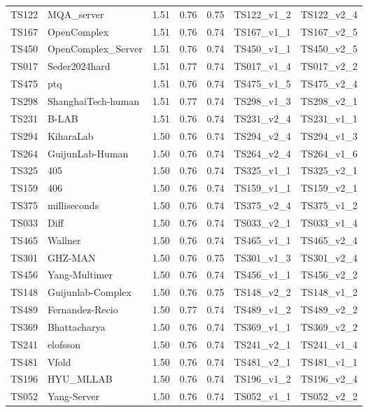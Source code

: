 \begin{longtable}{lllllll}
TS122 & MQA\_server & 1.51 & 0.76 & 0.75 & TS122\_v1\_2 & TS122\_v2\_4 \\ 
TS167 & OpenComplex & 1.51 & 0.76 & 0.74 & TS167\_v1\_1 & TS167\_v2\_5 \\ 
TS450 & OpenComplex\_Server & 1.51 & 0.76 & 0.74 & TS450\_v1\_1 & TS450\_v2\_5 \\ 
TS017 & Seder2024hard & 1.51 & 0.77 & 0.74 & TS017\_v1\_4 & TS017\_v2\_2 \\ 
TS475 & ptq & 1.51 & 0.76 & 0.74 & TS475\_v1\_5 & TS475\_v2\_4 \\ 
TS298 & ShanghaiTech-human & 1.51 & 0.77 & 0.74 & TS298\_v1\_3 & TS298\_v2\_1 \\ 
TS231 & B-LAB & 1.51 & 0.76 & 0.74 & TS231\_v2\_4 & TS231\_v1\_1 \\ 
TS294 & KiharaLab & 1.50 & 0.76 & 0.74 & TS294\_v2\_4 & TS294\_v1\_3 \\ 
TS264 & GuijunLab-Human & 1.50 & 0.76 & 0.74 & TS264\_v2\_4 & TS264\_v1\_6 \\ 
TS325 & 405 & 1.50 & 0.76 & 0.74 & TS325\_v1\_1 & TS325\_v2\_1 \\ 
TS159 & 406 & 1.50 & 0.76 & 0.74 & TS159\_v1\_1 & TS159\_v2\_1 \\ 
TS375 & milliseconds & 1.50 & 0.76 & 0.74 & TS375\_v2\_4 & TS375\_v1\_2 \\ 
TS033 & Diff & 1.50 & 0.76 & 0.74 & TS033\_v2\_1 & TS033\_v1\_4 \\ 
TS465 & Wallner & 1.50 & 0.76 & 0.74 & TS465\_v1\_1 & TS465\_v2\_4 \\ 
TS301 & GHZ-MAN & 1.50 & 0.76 & 0.75 & TS301\_v1\_3 & TS301\_v2\_4 \\ 
TS456 & Yang-Multimer & 1.50 & 0.76 & 0.74 & TS456\_v1\_1 & TS456\_v2\_2 \\ 
TS148 & Guijunlab-Complex & 1.50 & 0.76 & 0.75 & TS148\_v2\_2 & TS148\_v1\_2 \\ 
TS489 & Fernandez-Recio & 1.50 & 0.77 & 0.74 & TS489\_v1\_2 & TS489\_v2\_2 \\ 
TS369 & Bhattacharya & 1.50 & 0.76 & 0.74 & TS369\_v1\_1 & TS369\_v2\_2 \\ 
TS241 & elofsson & 1.50 & 0.76 & 0.74 & TS241\_v2\_1 & TS241\_v1\_4 \\ 
TS481 & Vfold & 1.50 & 0.76 & 0.74 & TS481\_v2\_1 & TS481\_v1\_1 \\ 
TS196 & HYU\_MLLAB & 1.50 & 0.76 & 0.74 & TS196\_v1\_2 & TS196\_v2\_4 \\ 
TS052 & Yang-Server & 1.50 & 0.76 & 0.74 & TS052\_v1\_1 & TS052\_v2\_2 \\ 

\end{longtable}

